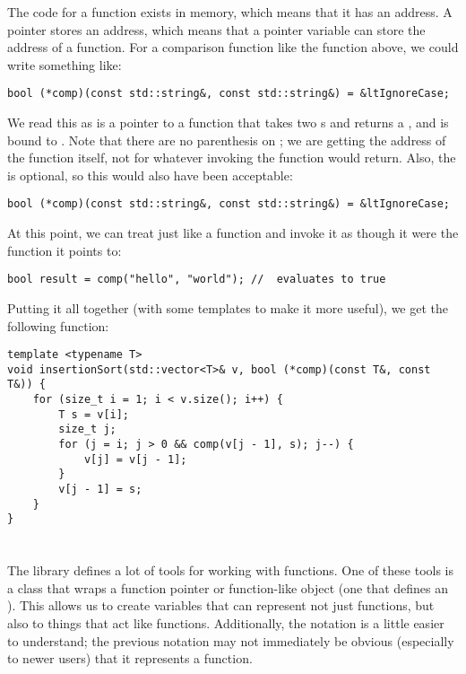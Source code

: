 The code for a function exists in memory, which means that it has an address.
A pointer stores an address, which means that a pointer variable can store the address of a function.
For a comparison function like the  function above, we could write something like:
\begin{lstlisting}
bool (*comp)(const std::string&, const std::string&) = &ltIgnoreCase;
\end{lstlisting}
We read this as  is a pointer to a function that takes two s and returns a , and is bound to .
Note that there are no parenthesis on ;
we are getting the address of the function itself, not for whatever invoking the function would return.
Also, the \code{\&} is optional, so this would also have been acceptable:
\begin{lstlisting}
bool (*comp)(const std::string&, const std::string&) = &ltIgnoreCase;
\end{lstlisting}

At this point, we can treat  just like a function and invoke it as though it were the function it points to:
\begin{lstlisting}
bool result = comp("hello", "world"); //  evaluates to true
\end{lstlisting}

Putting it all together (with some templates to make it more useful), we get the following function:

\begin{lstlisting}
template <typename T>
void insertionSort(std::vector<T>& v, bool (*comp)(const T&, const T&)) {
	for (size_t i = 1; i < v.size(); i++) {
		T s = v[i];
		size_t j;
		for (j = i; j > 0 && comp(v[j - 1], s); j--) {
			v[j] = v[j - 1];
		}
		v[j - 1] = s;
	}
}
\end{lstlisting}


\section{}

The  library defines a lot of tools for working with functions.
One of these tools is a class  that wraps a function pointer or function-like object (one that defines an ).
This allows us to create variables that can represent not just functions, but also to things that act like functions.
Additionally, the notation is a little easier to understand; the previous notation may not immediately be obvious (especially to newer users) that it represents a function.

